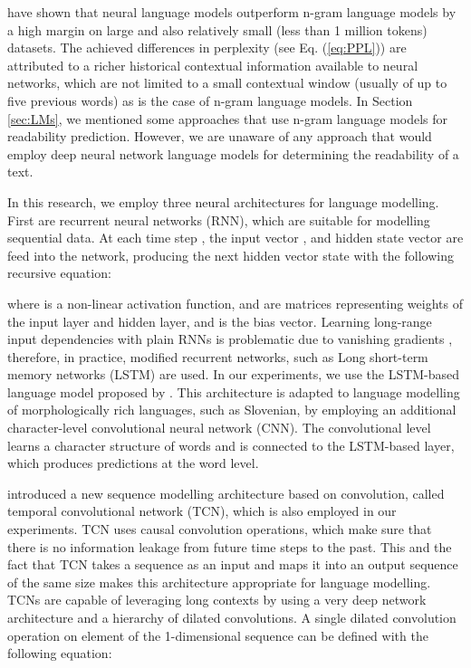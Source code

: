 \documentclass{clv3}
\begin{document}
\citet{mikolov2011empirical} have shown that neural language models outperform n-gram language models by a high margin on large and also relatively small (less than 1 million tokens) datasets. The achieved differences in perplexity (see Eq. (\ref{eq:PPL})) are attributed to a richer historical contextual information available to neural networks, which are not limited to a small contextual window (usually of up to five previous words) as is the case of n-gram language models. In Section \ref{sec:LMs}, we mentioned some approaches that use n-gram language models for readability prediction. However, we are unaware of any approach that would employ deep neural network language models for determining the readability of a text.

In this research, we employ three neural architectures for language modelling. First are recurrent neural networks (RNN), which are suitable for modelling sequential data. At each time step , the input vector , and hidden state vector  are feed into the network, producing the next hidden vector state  with the following recursive equation:

 
where  is a non-linear activation function,  and  are matrices representing weights of the input layer and hidden layer,  and  is the bias vector. Learning long-range input dependencies with plain RNNs is problematic due to vanishing gradients \citep{bengio1994learning}, therefore, in practice, modified recurrent networks, such as Long short-term memory networks (LSTM) are used. In our experiments, we use the LSTM-based language model proposed by \citet{kim2016character}. This architecture is adapted to language modelling of morphologically rich languages, such as Slovenian, by employing an additional character-level convolutional neural network (CNN). The convolutional level learns a character structure of words and is connected to the LSTM-based layer, which produces predictions at the word level.

 \citet{bai2018empirical} introduced a new sequence modelling architecture based on convolution, called temporal convolutional network (TCN), which is also employed in our experiments. TCN uses causal convolution operations, which make sure that there is no information leakage from future time steps to the past. This and the fact that TCN takes a sequence as an input and maps it into an output sequence of the same size makes this architecture appropriate for language modelling. TCNs are capable of leveraging long contexts by using a very deep network architecture and a hierarchy of dilated convolutions. A single dilated convolution operation  on element  of the 1-dimensional sequence  can  be defined with the following equation:
\end{document}
